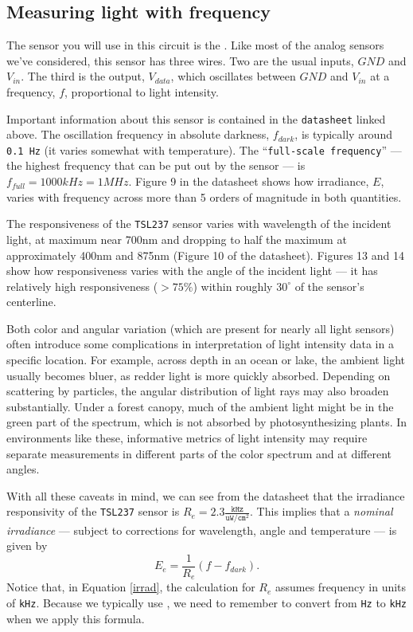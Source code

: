 {\subsection{Measuring light with frequency}
The sensor you will use in this circuit is the .
Like most of the analog sensors we've considered, this sensor has three wires.
Two are the usual inputs, $GND$ and $V_{in}$.
The third is the output, $V_{data}$, which oscillates between $GND$ and $V_{in}$ at a frequency, $f$, proportional to light intensity.

Important information about this sensor is contained in the \texttt{datasheet} linked above.
The oscillation frequency in absolute darkness, $f_{dark}$, is typically around \texttt{0.1 Hz} (it varies somewhat with temperature).
The ``\texttt{full-scale frequency}'' --- the highest frequency that can be put out by the sensor --- is $f_{full}=1000kHz=1MHz$.
Figure 9 in the datasheet shows how irradiance, $E$, varies with frequency across more than 5 orders of magnitude in both quantities.

The responsiveness of the \texttt{TSL237} sensor varies with wavelength of the incident light, at maximum near 700nm and dropping to half the maximum at approximately 400nm and 875nm (Figure 10 of the datasheet).
Figures 13 and 14 show how responsiveness varies with the angle of the incident light --- it has relatively high responsiveness ($>75\%$) within roughly $30^\circ$ of the sensor's centerline.

Both color and angular variation (which are present for nearly all light sensors) often introduce some complications in interpretation of light intensity data in a specific location.
For example, across depth in an ocean or lake, the ambient light usually becomes bluer, as redder light is more quickly absorbed.
Depending on scattering by particles, the angular distribution of light rays may also broaden substantially.
Under a forest canopy, much of the ambient light might be in the green part of the spectrum, which is not absorbed by photosynthesizing plants.
In environments like these, informative metrics of light intensity may require separate measurements in different parts of the color spectrum and at different angles.

With all these caveats in mind, we can see from the datasheet that the irradiance responsivity of the \texttt{TSL237} sensor is $R_e=2.3 \frac{\mathtt{kHz}}{\mathtt{uW}/\mathtt{cm}^2}$.
This implies that a \emph{nominal irradiance} --- subject to corrections for wavelength, angle and temperature --- is given by
\begin{equation}\label{irrad}
E_e = \frac{1}{R_e} (f-f_{dark}) .
\end{equation}
Notice that, in Equation \ref{irrad}, the calculation for $R_e$ assumes frequency in units of \texttt{kHz}.
Because we typically use , we need to remember to convert from \texttt{Hz} to \texttt{kHz} when we apply this formula.

}
